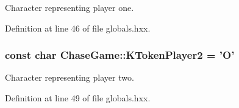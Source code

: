 Character representing player one. 



Definition at line 46 of file globals.\-hxx.

\hypertarget{namespace_chase_game_ae27343407c21a8d6e3cf26b736bd5527}{
\subsubsection[{K\-Token\-Player2}]{\setlength{\rightskip}{0pt plus 5cm}const char Chase\-Game\-::\-K\-Token\-Player2 = 'O'}}\label{namespace_chase_game_ae27343407c21a8d6e3cf26b736bd5527}


Character representing player two. 



Definition at line 49 of file globals.\-hxx.

